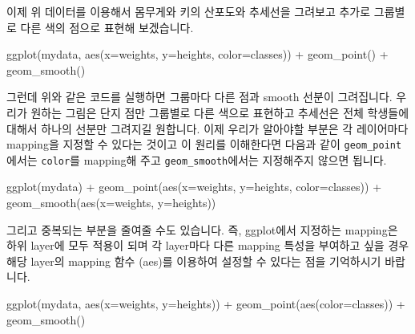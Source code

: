 \documentclass[
]{book}
\newenvironment{Shaded}{\begin{snugshade}}{\end{snugshade}}
\newcommand{\AttributeTok}[1]{\textcolor[rgb]{0.77,0.63,0.00}{#1}}
\newcommand{\FunctionTok}[1]{\textcolor[rgb]{0.00,0.00,0.00}{#1}}
\newcommand{\NormalTok}[1]{#1}
\newcommand{\SpecialCharTok}[1]{\textcolor[rgb]{0.00,0.00,0.00}{#1}}
\begin{document}
이제 위 데이터를 이용해서 몸무게와 키의 산포도와 추세선을 그려보고 추가로 그룹별로 다른 색의 점으로 표현해 보겠습니다.

\begin{Shaded}
\begin{Highlighting}[]
\FunctionTok{ggplot}\NormalTok{(mydata, }\FunctionTok{aes}\NormalTok{(}\AttributeTok{x=}\NormalTok{weights, }\AttributeTok{y=}\NormalTok{heights, }\AttributeTok{color=}\NormalTok{classes)) }\SpecialCharTok{+}
  \FunctionTok{geom\_point}\NormalTok{() }\SpecialCharTok{+}
  \FunctionTok{geom\_smooth}\NormalTok{()}
\end{Highlighting}
\end{Shaded}

그런데 위와 같은 코드를 실행하면 그룹마다 다른 점과 smooth 선분이 그려집니다. 우리가 원하는 그림은 단지 점만 그룹별로 다른 색으로 표현하고 추세선은 전체 학생들에 대해서 하나의 선분만 그려지길 원합니다. 이제 우리가 알아야할 부분은 각 레이어마다 mapping을 지정할 수 있다는 것이고 이 원리를 이해한다면 다음과 같이 \texttt{geom\_point}에서는 \texttt{color}를 mapping해 주고 \texttt{geom\_smooth}에서는 지정해주지 않으면 됩니다.

\begin{Shaded}
\begin{Highlighting}[]
\FunctionTok{ggplot}\NormalTok{(mydata) }\SpecialCharTok{+}
  \FunctionTok{geom\_point}\NormalTok{(}\FunctionTok{aes}\NormalTok{(}\AttributeTok{x=}\NormalTok{weights, }\AttributeTok{y=}\NormalTok{heights, }\AttributeTok{color=}\NormalTok{classes)) }\SpecialCharTok{+}
  \FunctionTok{geom\_smooth}\NormalTok{(}\FunctionTok{aes}\NormalTok{(}\AttributeTok{x=}\NormalTok{weights, }\AttributeTok{y=}\NormalTok{heights))}
\end{Highlighting}
\end{Shaded}

그리고 중복되는 부분을 줄여줄 수도 있습니다. 즉, ggplot에서 지정하는 mapping은 하위 layer에 모두 적용이 되며 각 layer마다 다른 mapping 특성을 부여하고 싶을 경우 해당 layer의 mapping 함수 (aes)를 이용하여 설정할 수 있다는 점을 기억하시기 바랍니다.

\begin{Shaded}
\begin{Highlighting}[]
\FunctionTok{ggplot}\NormalTok{(mydata, }\FunctionTok{aes}\NormalTok{(}\AttributeTok{x=}\NormalTok{weights, }\AttributeTok{y=}\NormalTok{heights)) }\SpecialCharTok{+}
  \FunctionTok{geom\_point}\NormalTok{(}\FunctionTok{aes}\NormalTok{(}\AttributeTok{color=}\NormalTok{classes)) }\SpecialCharTok{+}
  \FunctionTok{geom\_smooth}\NormalTok{()}
\end{Highlighting}
\end{Shaded}
\end{document}
